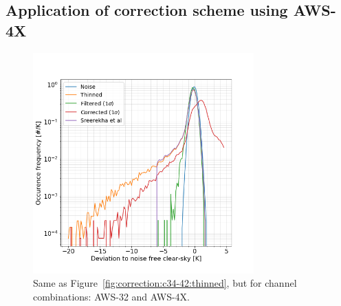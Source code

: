\documentclass[12pt]{article}
\begin{document}
\subsection{Application of correction scheme using AWS-4X}
%
\begin{figure}[!t]
	\centering
	\includegraphics[height=85mm]{PDF_corrected_AWS-32_AWS-4X_thinned}
	\caption{Same as Figure~\ref{fig:correction:c34-42:thinned}, but for channel combinations: AWS-32 and AWS-4X.}
	\label{fig:correction:c32-4X:thinned}
\end{figure}
%
\end{document}

